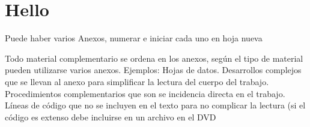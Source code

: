 \chapter{Hello}

Puede haber varios Anexos, numerar e iniciar cada uno en hoja nueva

Todo material complementario se ordena en los anexos, según el tipo de material pueden utilizarse varios anexos. 
Ejemplos: 
Hojas de datos. Desarrollos complejos que se llevan al anexo para simplificar la lectura del 
cuerpo del trabajo. Procedimientos complementarios que son se incidencia directa en el trabajo. 
Líneas de código que no se incluyen en el texto para no complicar la lectura (si el código es 
extenso debe incluirse en un archivo en el DVD

